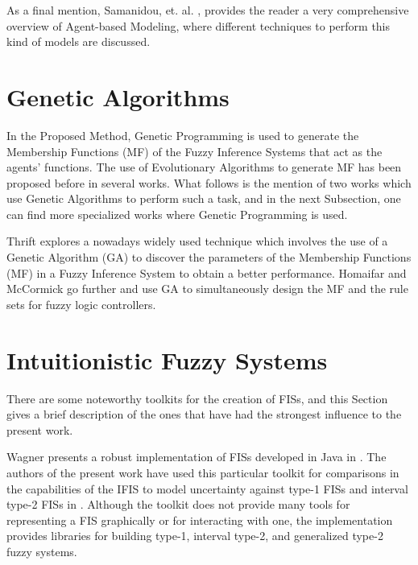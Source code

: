 As a final mention, Samanidou, et. al. \cite{Samanidou_2007}, provides the
reader a very comprehensive overview of Agent-based Modeling, where different
techniques to perform this kind of models are discussed.

\section{Genetic Algorithms}
\label{section:genetic-algorithms}


In the Proposed Method, Genetic Programming is used to generate the Membership
Functions (MF) of the Fuzzy Inference Systems that act as the agents'
functions. The use of Evolutionary Algorithms to generate MF has been proposed
before in several works. What follows is the mention of two works which use
Genetic Algorithms to perform such a task, and in the next Subsection, one can
find more specialized works where Genetic Programming is used.

Thrift \cite{Thrift1991} explores a nowadays widely used technique which
involves the use of a Genetic Algorithm (GA) to discover the parameters of the
Membership Functions (MF) in a Fuzzy Inference System to obtain a better
performance. Homaifar and McCormick \cite{Homaifar1995} go further and use GA to
simultaneously design the MF and the rule sets for fuzzy logic controllers.

\section{Intuitionistic Fuzzy Systems}
\label{section:related-work-intuitionistic-fuzzy-systems}


There are some noteworthy toolkits for the creation of FISs, and this Section
gives a brief description of the ones that have had the strongest influence to
the present work.

Wagner presents a robust implementation of FISs developed in Java in
\cite{Wagner2013}. The authors of the present work have used this particular
toolkit for comparisons in the capabilities of the IFIS to model uncertainty
against type-1 FISs and interval type-2 FISs in
\cite{Hernandez-Aguila2016}. Although the toolkit does not provide many tools
for representing a FIS graphically or for interacting with one, the
implementation provides libraries for building type-1, interval type-2, and
generalized type-2 fuzzy systems.

